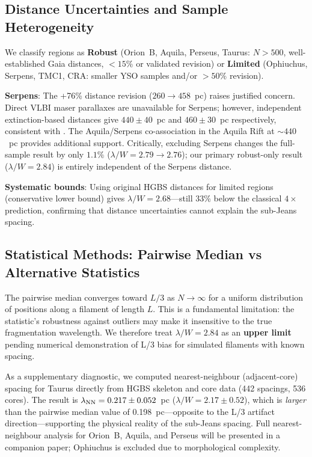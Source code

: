 \documentclass[twoside,twocolumn]{mnras}
\begin{document}
\subsection{Distance Uncertainties and Sample Heterogeneity}
\label{sec:distance_uncertainties}

We classify regions as \textbf{Robust} (Orion~B, Aquila, Perseus, Taurus: $N>500$,
well-established Gaia distances, $<15\%$ or validated revision) or \textbf{Limited}
(Ophiuchus, Serpens, TMC1, CRA: smaller YSO samples and/or $>50\%$ revision).

\textbf{Serpens}: The +76\% distance revision ($260 \to 458$~pc) raises justified
concern. Direct VLBI maser parallaxes are unavailable for Serpens; however, independent
extinction-based distances \citep{Yan2022, Green2024} give $440 \pm 40$~pc and
$460 \pm 30$~pc respectively, consistent with \citealt{Zhang2023}. The Aquila/Serpens
co-association in the Aquila Rift at ${\sim}440$~pc \citep{Zucker2020} provides
additional support. Critically, excluding Serpens changes the full-sample
result by only $1.1\%$ ($\lambda/W = 2.79 \to 2.76$); our primary robust-only
result ($\lambda/W = 2.84$) is entirely independent of the Serpens distance.

\textbf{Systematic bounds}: Using original HGBS distances for limited regions
(conservative lower bound) gives $\lambda/W = 2.68$---still 33\% below the classical
$4\times$ prediction, confirming that distance uncertainties cannot explain the
sub-Jeans spacing.

\subsection{Statistical Methods: Pairwise Median vs Alternative Statistics}
\label{sec:statistics}

The pairwise median converges toward $L/3$ as $N \to \infty$ for a uniform distribution
of positions along a filament of length $L$. This is a fundamental limitation: the
statistic's robustness against outliers may make it insensitive to the true fragmentation
wavelength. We therefore treat $\lambda/W = 2.84$ as an \textbf{upper limit} pending
numerical demonstration of L/3 bias for simulated filaments with known spacing.

As a supplementary diagnostic, we computed nearest-neighbour (adjacent-core) spacing
for Taurus directly from HGBS skeleton and core data (442 spacings, 536 cores).
The result is $\lambda_{\rm NN} = 0.217 \pm 0.052$~pc ($\lambda/W = 2.17 \pm 0.52$),
which is \textit{larger} than the pairwise median value of 0.198~pc---opposite to
the L/3 artifact direction---supporting the physical reality of the sub-Jeans spacing.
Full nearest-neighbour analysis for Orion~B, Aquila, and Perseus will be presented in
a companion paper; Ophiuchus is excluded due to morphological complexity.
\end{document}
